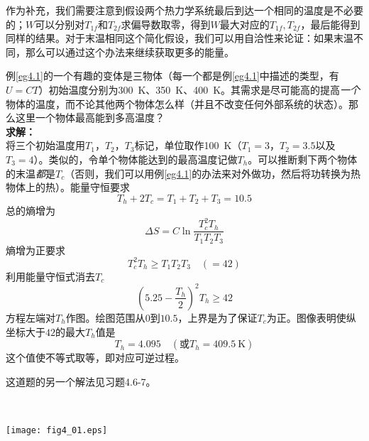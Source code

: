 作为补充，我们需要注意到假设两个热力学系统最后到达一个相同的温度是不必要的；$W$可以分别对$T_{1f}$和$T_{2f}$求偏导数取零，得到$W$最大对应的$T_{1f}, T_{2f}$，最后能得到同样的结果。对于末温相同这个简化假设，我们可以用自洽性来论证：如果末温不同，那么可以通过这个办法来继续获取更多的能量。

\begin{example}\label{eg4.2}
例\ref{eg4.1}的一个有趣的变体是三物体（每一个都是例\ref{eg4.1}中描述的类型，有$U=CT$）初始温度分别为\SI{300}{\kelvin}、\SI{350}{\kelvin}、\SI{400}{\kelvin}。其需求是尽可能高的提高{\it 一个}物体的温度，而不论其他两个物体怎么样（并且不改变任何外部系统的状态）。那么这里一个物体最高能到多高温度？\\
{\bf 求解：}\\
将三个初始温度用$T_1$，$T_2$，$T_3$标记，单位取作\SI{100}{\kelvin}（$T_1=3$，$T_2=3.5$以及$T_3=4$）。类似的，令单个物体能达到的最高温度记做$T_h$。可以推断剩下两个物体的末温{\it 都}是$T_c$（否则，我们可以用例\ref{eg4.1}的办法来对外做功，然后将功转换为热物体上的热）。能量守恒要求
\[
T_h + 2T_c = T_1 + T_2 + T_3 = 10.5
\]
总的熵增为
\[
\Delta S = C\ln\frac{T_c^2T_h}{T_1T_2T_3}
\]
熵增为正要求
\[
T_c^2T_h \ge T_1T_2T_3 \quad (=42)
\]
利用能量守恒式消去$T_c$
\[
(5.25-\frac{T_h}{2})^2T_h\ge 42
\]
方程左端对$T_h$作图。绘图范围从$0$到$10.5$，上界是为了保证$T_c$为正。图像表明使纵坐标大于$42$的最大$T_h$值是
\[
T_h = 4.095 \quad(\text{或}T_h = \SI{409.5}{\kelvin})
\]
这个值使不等式取等，即对应可逆过程。
\end{example}

这道题的另一个解法见习题4.6-7。

\ 

{
	\centering
	\texttt{[image: fig4\_01.eps]} 
	\figcaption{ }
}

